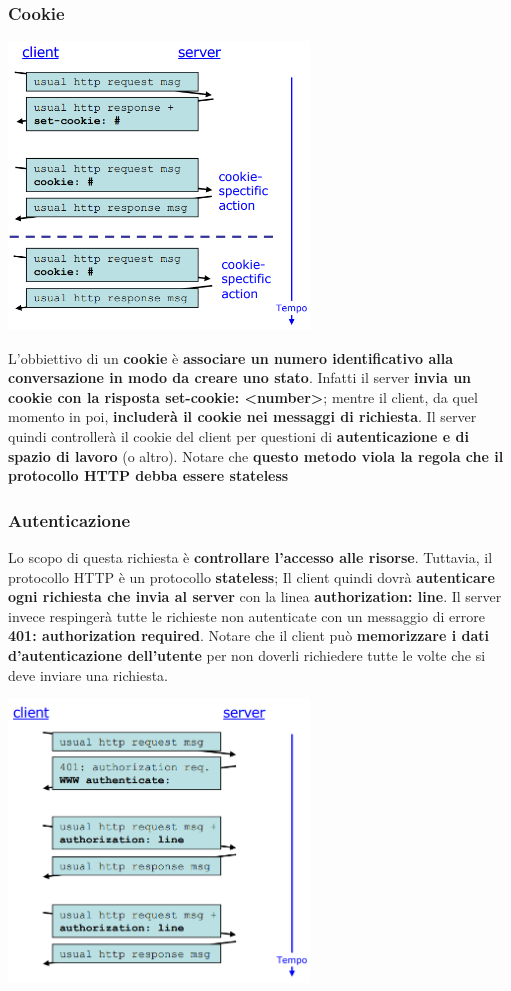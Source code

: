 \documentclass[12pt]{article}
\begin{document}
\subsubsection{Cookie}
\begin{center}
    \includegraphics[width = 0.60\textwidth]{Images/126.PNG}
\end{center}
L'obbiettivo di un \textbf{cookie} è \textbf{associare un numero identificativo alla conversazione in modo da creare uno stato}. Infatti il server \textbf{invia un cookie con la risposta set-cookie: <number>}; mentre il client, da quel momento in poi, \textbf{includerà il cookie nei messaggi di richiesta}. Il server quindi controllerà il cookie del client per questioni di \textbf{autenticazione e di spazio di lavoro} (o altro). Notare che \textbf{questo metodo viola la regola che il protocollo HTTP debba essere stateless}
\subsubsection{Autenticazione}
Lo scopo di questa richiesta è \textbf{controllare l'accesso alle risorse}. Tuttavia, il protocollo HTTP è un protocollo \textbf{stateless}; Il client quindi dovrà \textbf{autenticare ogni richiesta che invia al server} con la linea \textbf{authorization: line}. Il server invece respingerà tutte le richieste non autenticate con un messaggio di errore \textbf{401: authorization required}. Notare che il client può \textbf{memorizzare i dati d'autenticazione dell'utente} per non doverli richiedere tutte le volte che si deve inviare una richiesta.
\begin{center}
    \includegraphics[width = 0.60\textwidth]{Images/127.PNG}
\end{center}
\end{document}

